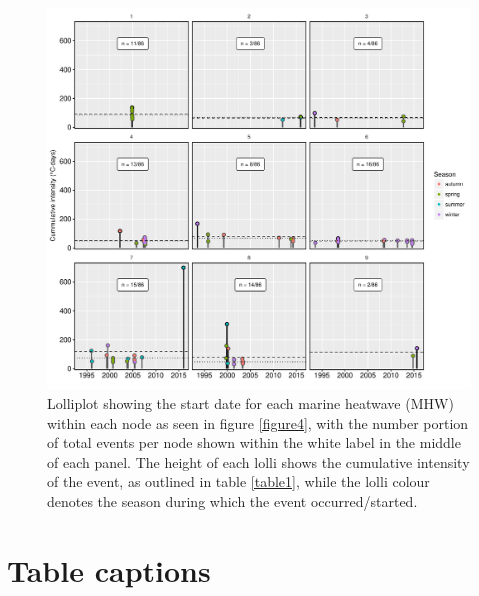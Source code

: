\documentclass[utf8]{frontiersSCNS}
\begin{document}
\begin{figure}[]
\begin{center}
\includegraphics[width=1.0\textwidth]{figure_5.pdf}
\end{center}
\caption{Lolliplot showing the start date for each marine heatwave (MHW) within each node as seen in figure \ref{figure4}, with the number portion of total events per node shown within the white label in the middle of each panel. The height of each lolli shows the cumulative intensity of the event, as outlined in table \ref{table1}, while the lolli colour denotes the season during which the event occurred/started.}
\label{figure5}
\end{figure}


\section*{Table captions}
\end{document}
